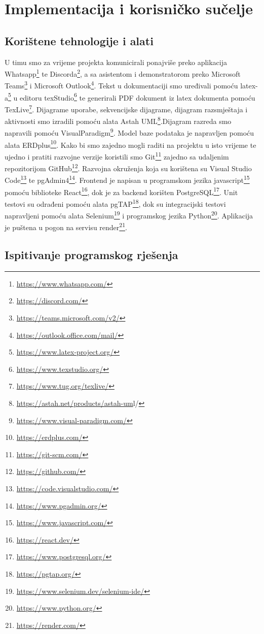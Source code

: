 \chapter{Implementacija i korisničko sučelje}
		
		
		\section{Korištene tehnologije i alati}

			 U timu smo za vrijeme projekta komunicirali ponajviše preko aplikacija Whatsapp\footnote{\url{https://www.whatsapp.com/}} te Discorda\footnote{\url{https://discord.com/}}, a sa asistentom i demonstratorom preko Microsoft Teams\footnote{\url{https://teams.microsoft.com/v2/}} i Microsoft Outlook\footnote{\url{https://outlook.office.com/mail/}}. Tekst u dokumentaciji smo uređivali pomoću latex-a\footnote{\url{https://www.latex-project.org/}} u editoru texStudio\footnote{\url{https://www.texstudio.org/}} te generirali PDF dokument iz latex dokumenta pomoću TexLive\footnote{\url{https://www.tug.org/texlive/}}. Dijagrame uporabe, sekvencijske dijagrame, dijagram razsmještaja i aktivnosti smo izradili pomoću alata Astah UML\footnote{\url{https://astah.net/products/astah-um}l/}.Dijagram razreda smo napravili pomoću VisualParadigm\footnote{\url{https://www.visual-paradigm.com/}}. Model baze podataka je napravljen pomoću alata ERDplus\footnote{\url{https://erdplus.com/}}. Kako bi smo zajedno mogli raditi na projektu u isto vrijeme te ujedno i pratiti razvojne verzije koristili smo Git\footnote{\url{https://git-scm.com/}} zajedno sa udaljenim repozitorijom GitHub\footnote{\url{https://github.com/}}. Razvojna okruženja koja su korištena su Visual Studio Code\footnote{\url{https://code.visualstudio.com/}} te pgAdmin4\footnote{\url{https://www.pgadmin.org/}}. Frontend je napisan u programskom jezika javascript\footnote{\url{https://www.javascript.com/}} pomoću biblioteke React\footnote{\url{https://react.dev/}}, dok je za backend korišten PostgreSQL\footnote{\url{https://www.postgresql.org/}}. Unit testovi su odrađeni pomoću alata pgTAP\footnote{\url{https://pgtap.org/}}, dok su integracijski testovi napravljeni pomoću alata Selenium\footnote{\url{https://www.selenium.dev/selenium-ide/}} i programskog  jezika Python\footnote{\url{https://www.python.org/}}.
			 Aplikacija je puštena u pogon na servisu render\footnote{\url{https://render.com/}}.
			\eject 
		
	
		\section{Ispitivanje programskog rješenja}
			
